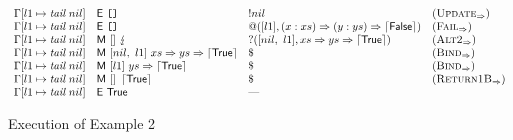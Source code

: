 \begin{figure*}
\[\begin{array}{llll}
      \Gamma[l1\mapsto\textit{tail}~nil] & \textsf{E}~\texttt{[]}                                             & !nil               & (\textsc{Update}_{\Rightarrow})   \\
      \Gamma[l1\mapsto\textit{tail}~nil] & \textsf{E}~\texttt{[]}                                             & @([l1],(x : xs) \Rightarrow (y : ys) \Rightarrow \left\lceil \textsf{False}\right\rceil)     & (\textsc{Fail}_{\Rightarrow})     \\
      \Gamma[l1\mapsto\textit{tail}~nil] & \textsf{M}~[]~\lightning                                  & ?([nil,~l1],xs \Rightarrow ys \Rightarrow \left\lceil \textsf{True}\right\rceil) & (\textsc{Alt2}_{\Rightarrow})     \\
      \Gamma[l1\mapsto\textit{tail}~nil] & \textsf{M}~[nil,~l1]~xs \Rightarrow ys \Rightarrow \left\lceil \textsf{True}\right\rceil                            & \$                     & (\textsc{Bind}_{\Rightarrow})     \\
      \Gamma[l1\mapsto\textit{tail}~nil] & \textsf{M}~[l1]~ys \Rightarrow \left\lceil \textsf{True}\right\rceil                   & \$                     & (\textsc{Bind}_{\Rightarrow})     \\
      \Gamma[l1\mapsto\textit{tail}~nil] & \textsf{M}~[]~\left\lceil \textsf{True}\right\rceil                                    & \$                     & (\textsc{Return1B}_{\Rightarrow}) \\
      \Gamma[l1\mapsto\textit{tail}~nil] & \textsf{E}~\textsf{True}{}                                          & \text{---}             &                        \\
    \end{array}
  \]
  \caption{Execution of Example 2}
  \label{fig:ex-lazy}
\end{figure*}



